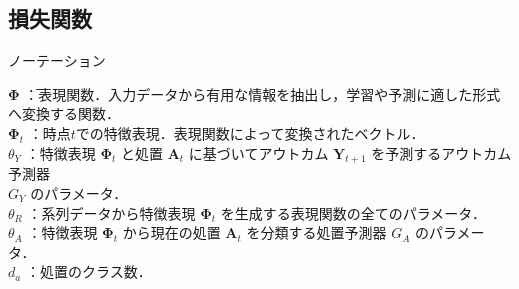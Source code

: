 \documentclass[dvipdfmx]{jreport}
\begin{document}
\subsection{損失関数} \label{損失}
\begin{itembox}[l]{\large{ノーテーション}}
    \begin{tabbing}
        \hspace{15pt} \raisebox{0.5ex}{\tiny $\bullet$} $\boldsymbol{\Phi}$ \=：表現関数．入力データから有用な情報を抽出し，学習や予測に適した形式へ変換する関数．\\[0.5em]
        \hspace{15pt} \raisebox{0.5ex}{\tiny $\bullet$} $\boldsymbol{\Phi}_t$ \>：時点$t$での特徴表現．表現関数によって変換されたベクトル．\\[0.5em]
        \hspace{15pt} \raisebox{0.5ex}{\tiny $\bullet$} $\theta_Y$ \>：特徴表現 $\boldsymbol{\Phi}_t$ と処置 $\mathbf{A}_t$ に基づいてアウトカム $\mathbf{Y}_{t+1}$ を予測するアウトカム予測器\\[0.5em]\>\hspace{6.5pt}$G_Y$ のパラメータ． \\[0.5em]
        \hspace{15pt} \raisebox{0.5ex}{\tiny $\bullet$} $\theta_R$ \>：系列データから特徴表現 $\boldsymbol{\Phi}_t$ を生成する表現関数の全てのパラメータ． \\[0.5em]
        \hspace{15pt} \raisebox{0.5ex}{\tiny $\bullet$} $\theta_A$ \>：特徴表現 $\boldsymbol{\Phi}_t$ から現在の処置 $\mathbf{A}_t$ を分類する処置予測器 $G_A$ のパラメータ． \\[0.5em]
        \hspace{15pt} \raisebox{0.5ex}{\tiny $\bullet$} $d_a$ \>：処置のクラス数．
    \end{tabbing}
\end{itembox}
\end{document}
